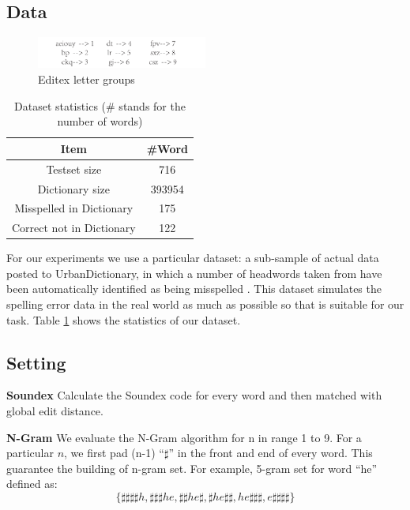 \documentclass[11pt]{article}
\begin{document}
\subsection{Data} 

\begin{figure}
	\centering
	\includegraphics[width=0.5\textwidth]{img/editex.pdf}
	\caption{Editex letter groups}
	\label{fig:editex}
\end{figure}

\begin{table}
	\centering
	\begin{tabular}{c|c}
		\hline
		Item & \#Word \\
		\hline
		Testset size & 716 \\
		\hline
		Dictionary  size & 393954 \\
		\hline
		Misspelled in Dictionary & 175 \\
		\hline
		Correct not in Dictionary & 122 \\
		\hline
	\end{tabular}
	\caption{Dataset statistics (\# stands for the number of words)}
	\label{tab:dataset}
\end{table}

For our experiments we use a particular dataset:  a sub-sample of actual data posted to UrbanDictionary, in which a number of headwords taken from have been automatically identified as being misspelled \cite{Saphra2016EvaluatingIW}. This dataset simulates the spelling error data in the real world as much as possible so that is suitable for our task. Table \ref{tab:dataset} shows the statistics of our dataset.

\subsection{Setting} 

\noindent\textbf{Soundex} Calculate the Soundex code for every word and then matched with global edit distance.

\noindent\textbf{N-Gram} We evaluate the N-Gram algorithm for n in range 1 to 9. For a particular $n$, we first pad (n-1) ``$\sharp$'' in the front and end of every word. This guarantee the building of n-gram set. For example, 5-gram set for word ``he'' defined as: 
\begin{equation}
\{\sharp\sharp\sharp\sharp h, \sharp\sharp\sharp he, \sharp\sharp he\sharp, \sharp he\sharp\sharp, he\sharp\sharp\sharp, e\sharp\sharp\sharp\sharp\}
\end{equation}
\end{document}
